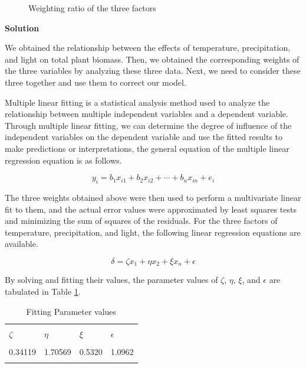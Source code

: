 \documentclass[12pt]{article}
\begin{document}
\begin{figure}[htb]
	\centering
	
	\caption{Weighting ratio of the three factors}
	\label{fig:pie}
\end{figure}

\vspace{0.5cm}

\textbf{Solution}

\vspace{0.5cm}

We obtained the relationship between the effects of temperature, precipitation, and light on total plant biomass. Then, we obtained the corresponding weights of the three variables by analyzing these three data. Next, we need to consider these three together and use them to correct our model.

Multiple linear fitting is a statistical analysis method used to analyze the relationship between multiple independent variables and a dependent variable. Through multiple linear fitting, we can determine the degree of influence of the independent variables on the dependent variable and use the fitted results to make predictions or interpretations, the general equation of the multiple linear regression equation is as follows.

\begin{equation}
	y_i =  b_1  x_{i1} + b_2  x_{i2} + \cdots + b_n  x_{in} + e_i
\end{equation}

The three weights obtained above were then used to perform a multivariate linear fit to them, and the actual error values were approximated by least squares tests and minimizing the sum of squares of the residuals. For the three factors of temperature, precipitation, and light, the following linear regression equations are available.

\begin{equation}
	\delta = \zeta x_1 + \eta x_2 + \xi x_n + \epsilon
\end{equation}

By solving and fitting their values, the parameter values of $\zeta$, $ \eta$, $\xi$, and $\epsilon$ are tabulated in Table \ref{tab:fitting}.

\begin{table}[htb]
	\centering
	\caption{Fitting Parameter values}
	\begin{tabular}{@{}llll@{}}
		\toprule                                \\
		$\zeta$ & $\eta$  & $\xi$  & $\epsilon$ \\
		\midrule                                \\
		0.34119 & 1.70569 & 0.5320 & 1.0962     \\
		\bottomrule                             \\
	\end{tabular}
	\label{tab:fitting}
\end{table}
\end{document}
